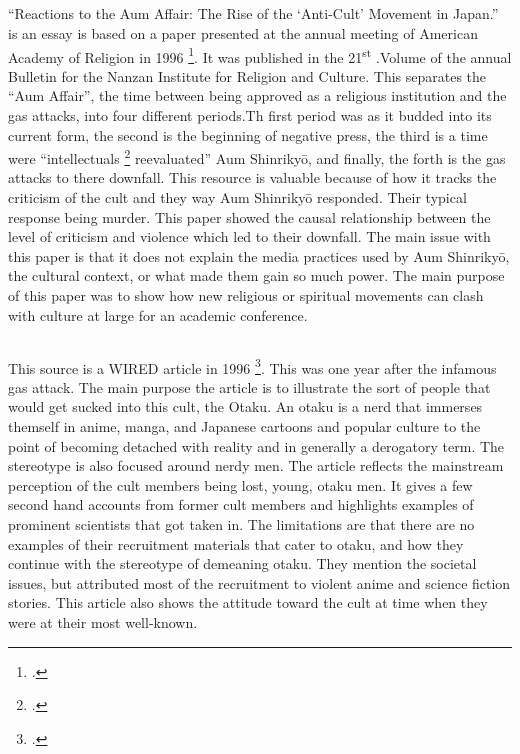 \documentclass[12pt, letterpaper]{article}
\newcommand{\sorta}[1]{`#1'}
\newcommand{\say}[1]{``#1''}
\begin{document}
\subsection{}
\say{Reactions to the Aum Affair: The Rise of the \sorta{Anti-Cult} Movement in Japan.} is an essay is based
on a paper presented at the annual meeting of American Academy of Religion in 1996
\footcite{watanabe_reactions_1997}. It
was published in the 21\textsuperscript{st} .Volume of the annual Bulletin for the Nanzan Institute for
Religion and Culture. This separates the \say{Aum Affair}, the time between being approved as a religious
institution and the gas attacks, into four different periods.Th  first period was as it budded into its
current form, the second is the beginning of negative press, the third is a time were \say{intellectuals 
  \footcite[33]{watanabe_reactions_1997} reevaluated} Aum Shinriky\=o, and finally, the forth is the gas attacks to there downfall. This resource is valuable because of how it tracks the criticism of the cult and
they way Aum Shinriky\=o responded. Their typical response being murder. This paper showed the causal
relationship between the level of criticism and violence which led to their downfall. The main issue with
this paper is that it does not explain the media practices used by Aum Shinriky\=o, the cultural context, or
what made them gain so much power. The main purpose of  this paper was to show how new religious or spiritual
movements can clash with culture at large for an academic conference.

\subsection{}

This source is a WIRED article in 1996 \footcite{noauthor_cult_nodate}. This was one year after the infamous gas attack. The main purpose 
the article is to illustrate the sort of people that would get sucked into this cult, the Otaku. An otaku
is a nerd that immerses themself in anime, manga, and Japanese cartoons and popular culture to the point of
becoming detached with reality and in generally a derogatory term. The stereotype is also focused around 
nerdy men. The article reflects the mainstream perception of the cult members being lost, young, 
otaku men. It gives a few second hand accounts from former cult members and highlights examples of 
prominent scientists that got taken in. The limitations are that there are no examples of their recruitment
materials that cater to otaku, and how they continue with the stereotype of demeaning otaku. They mention
the societal issues, but attributed most of the recruitment to violent anime and science fiction stories.
This article also shows the attitude toward the cult at time when they were at their most well-known. 
\end{document}
